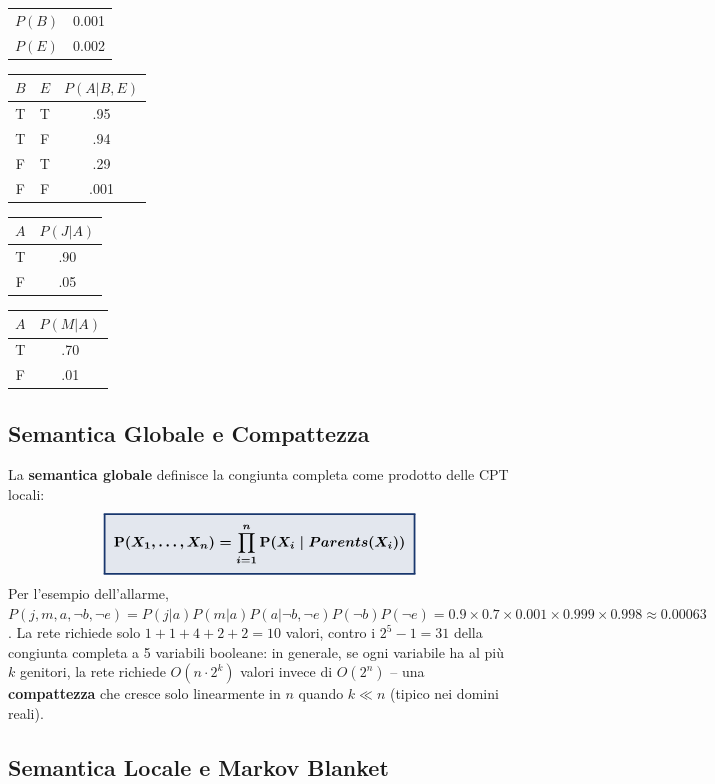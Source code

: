 \documentclass[a4paper,11pt]{article}
\newcommand{\keyeq}[1]{{\setlength{\fboxsep}{6pt}\setlength{\fboxrule}{1.3pt}\fcolorbox{iablue}{iablue!12}{\boldmath$\displaystyle #1$}}}
\begin{document}
\begin{center}
\small
\begin{tabular}{lc}
\toprule
$P(B)$ & 0.001 \\
$P(E)$ & 0.002 \\
\bottomrule
\end{tabular}
\quad
\begin{tabular}{ccc}
\toprule
$B$ & $E$ & $P(A|B,E)$ \\
\midrule
T & T & .95 \\
T & F & .94 \\
F & T & .29 \\
F & F & .001 \\
\bottomrule
\end{tabular}
\quad
\begin{tabular}{cc}
\toprule
$A$ & $P(J|A)$ \\
\midrule
T & .90 \\
F & .05 \\
\bottomrule
\end{tabular}
\quad
\begin{tabular}{cc}
\toprule
$A$ & $P(M|A)$ \\
\midrule
T & .70 \\
F & .01 \\
\bottomrule
\end{tabular}
\end{center}

\subsection{Semantica Globale e Compattezza}

La \textbf{semantica globale} definisce la congiunta completa come prodotto delle CPT locali:
\[
\keyeq{\mathbf{P}(X_1,\ldots,X_n) = \prod_{i=1}^n \mathbf{P}(X_i\mid Parents(X_i))}
\]
Per l'esempio dell'allarme, $P(j,m,a,\neg b,\neg e)=P(j|a)P(m|a)P(a|\neg b,\neg e)P(\neg b)P(\neg e)=0.9\times0.7\times0.001\times0.999\times0.998\approx0.00063$. La rete richiede solo $1{+}1{+}4{+}2{+}2=10$ valori, contro i $2^5{-}1=31$ della congiunta completa a 5 variabili booleane: in generale, se ogni variabile ha al più $k$ genitori, la rete richiede $O(n\cdot2^k)$ valori invece di $O(2^n)$ -- una \textbf{compattezza} che cresce solo linearmente in $n$ quando $k\ll n$ (tipico nei domini reali).

\subsection{Semantica Locale e Markov Blanket}
\end{document}
